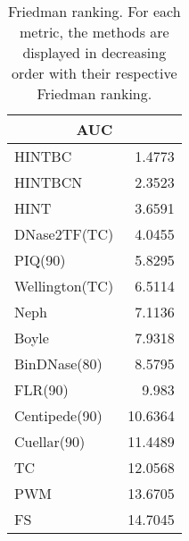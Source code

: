 \documentclass[landscape, 6pt]{report}
\begin{document}
\begin{table}[h!]
\label{tab:ranking}
\vspace{0.0cm}
\begin{center}
\caption{Friedman ranking. For each metric, the methods are displayed in decreasing order with their respective Friedman ranking.}
\renewcommand{\arraystretch}{1.2}
  \begin{tabular}{ |lr| }
    \hline
    \multicolumn{2}{|c|}{\textbf{AUC}} \\
    \hline
    HINTBC & 1.4773 \\
    HINTBCN & 2.3523 \\
    HINT & 3.6591 \\
    DNase2TF(TC) & 4.0455 \\
    PIQ(90) & 5.8295 \\
    Wellington(TC) & 6.5114 \\
    Neph & 7.1136 \\
    Boyle & 7.9318 \\
    BinDNase(80) & 8.5795 \\
    FLR(90) & 9.983 \\
    Centipede(90) & 10.6364 \\
    Cuellar(90) & 11.4489 \\
    TC & 12.0568 \\
    PWM & 13.6705 \\
    FS & 14.7045 \\
    \hline
  \end{tabular}
\end{center}
\vspace{0.0cm}
\end{table}
\end{document}
